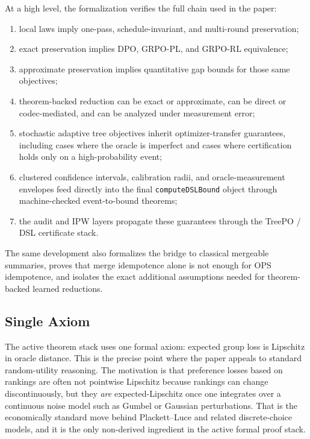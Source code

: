 At a high level, the formalization verifies the full chain used in the paper:
\begin{enumerate}[nosep]
    \item local laws imply one-pass, schedule-invariant, and multi-round preservation;
    \item exact preservation implies DPO, GRPO-PL, and GRPO-RL equivalence;
    \item approximate preservation implies quantitative gap bounds for those same objectives;
    \item theorem-backed reduction can be exact or approximate, can be direct or codec-mediated, and can be analyzed under measurement error;
    \item stochastic adaptive tree objectives inherit optimizer-transfer guarantees, including cases where the oracle is imperfect and cases where certification holds only on a high-probability event;
    \item clustered confidence intervals, calibration radii, and oracle-measurement envelopes feed directly into the final \texttt{computeDSLBound} object through machine-checked event-to-bound theorems;
    \item the audit and IPW layers propagate these guarantees through the TreePO / DSL certificate stack.
\end{enumerate}

The same development also formalizes the bridge to classical mergeable
summaries, proves that merge idempotence alone is not enough for OPS
idempotence, and isolates the exact additional assumptions needed for
theorem-backed learned reductions.

\subsection{Single Axiom}

The active theorem stack uses one formal axiom: expected group loss is
Lipschitz in oracle distance. This is the precise point where the paper appeals
to standard random-utility reasoning. The motivation is that preference losses
based on rankings are often not pointwise Lipschitz because rankings can change
discontinuously, but they \emph{are} expected-Lipschitz once one integrates over
a continuous noise model such as Gumbel or Gaussian perturbations. That is the
economically standard move behind Plackett--Luce and related discrete-choice
models, and it is the only non-derived ingredient in the active formal proof
stack.

